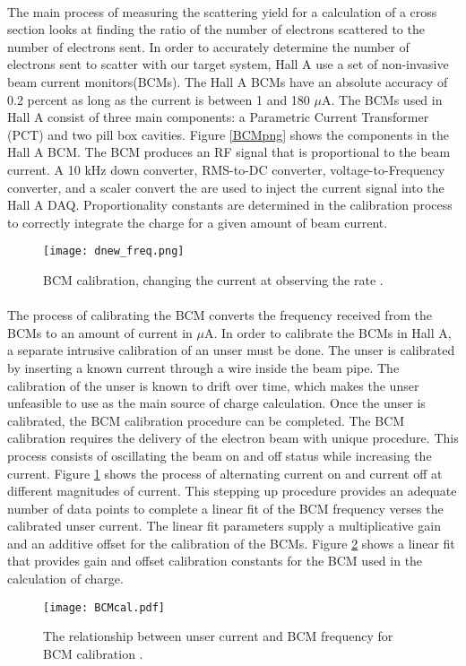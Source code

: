 	\paragraph{} The main process of measuring the scattering yield for a calculation of a cross section looks at finding the ratio of the number of electrons scattered to the number of electrons sent. In order to accurately determine the number of electrons sent to scatter with our target system, Hall A use a set of non-invasive beam current monitors(BCMs). The Hall A BCMs have an absolute accuracy of 0.2 percent as long as the current is between 1 and 180 $\mu$A. The BCMs used in Hall A consist of three main components: a Parametric Current Transformer (PCT) and two pill box cavities. Figure \ref{BCMpng} shows the components in the Hall A BCM.  The BCM produces an RF signal that is proportional to the beam current. A 10 kHz down converter, RMS-to-DC converter, voltage-to-Frequency converter, and a scaler convert the are used to inject the current signal into the Hall A DAQ. Proportionality constants are determined in the calibration process to correctly integrate the charge for a given amount of beam current\cite{BCM1}.
	\begin{figure}[t]
		\centering
		\texttt{[image: dnew\_freq.png]}
		\caption{BCM calibration, changing the current at observing the rate \cite{MikeTh}.
		\label{dnewfreq}}
	\end{figure}
	\paragraph{}The process of calibrating the BCM converts the frequency received from the BCMs to an amount of current in $\mu$A. In order to calibrate the BCMs in Hall A, a separate intrusive calibration of an unser must be done. The unser is calibrated by inserting a known current through a wire inside the beam pipe. The calibration of the unser is known to drift over time, which makes the unser unfeasible to use as the main source of charge calculation. Once the unser is calibrated, the BCM calibration procedure can be completed. The BCM calibration requires the delivery of the electron beam with unique procedure. This process consists of oscillating the beam on and off status while increasing the current. Figure \ref{dnewfreq} shows the process of alternating current on and current off at different magnitudes of current. This stepping up procedure provides an adequate number of data points to complete a linear fit of the BCM frequency verses the calibrated unser current. The linear fit parameters supply a multiplicative gain and an additive offset for the calibration of the BCMs. Figure \ref{bcmcal} shows a linear fit that provides gain and offset calibration constants for the BCM used in the calculation of charge. 
	\begin{figure}[t]
		\centering
		\texttt{[image: BCMcal.pdf]}
		\caption{The relationship between unser current and BCM frequency for BCM calibration \cite{MikeTh}.
			\label{bcmcal}}
	\end{figure}	
	  
